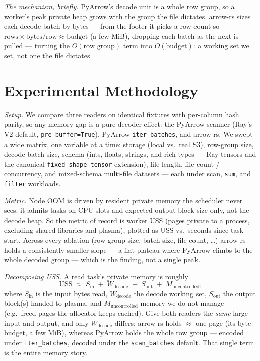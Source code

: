 \documentclass[10pt,twocolumn]{article}
\begin{document}
\emph{The mechanism, briefly.} PyArrow's decode unit is a whole row group, so a worker's
peak private heap grows with the group the file dictates. arrow-rs sizes each decode
batch by bytes --- from the footer it picks a row count so
$\text{rows}\times\text{bytes/row}\approx\text{budget}$ (a few MiB), dropping each batch
as the next is pulled --- turning the $O(\text{row group})$ term into $O(\text{budget})$:
a working set we set, not one the file dictates.

\section{Experimental Methodology}
\emph{Setup.} We compare three readers on identical fixtures with per-column hash parity,
so any memory gap is a pure decoder effect: the PyArrow scanner (Ray's V2 default,
\texttt{pre\_buffer=True}), PyArrow \texttt{iter\_batches}, and arrow-rs. We swept a wide
matrix, one variable at a time: storage (local vs.\ real S3), row-group size, decode batch
size, schema (ints, floats, strings, and rich types --- Ray tensors and the canonical
\texttt{fixed\_shape\_tensor} extension), file length, file count / concurrency, and
mixed-schema multi-file datasets --- each under scan, \texttt{sum}, and \texttt{filter}
workloads.

\emph{Metric.} Node OOM is driven by resident private memory the scheduler never sees: it
admits tasks on CPU slots and expected output-block size only, not the decode heap. So
the metric of record is worker USS (pages private to a process, excluding shared libraries
and plasma), plotted as USS vs.\ seconds since task start. Across every ablation
(row-group size, batch size, file count, \dots) arrow-rs holds a consistently smaller
slope --- a flat plateau where PyArrow climbs to the whole decoded group --- which is the
finding, not a single peak.

\emph{Decomposing USS.} A read task's private memory is roughly
\begin{equation*}
\text{USS} \;\approx\; S_\text{in} \;+\; W_\text{decode} \;+\; S_\text{out} \;+\; M_\text{uncontrolled},
\end{equation*}
where $S_\text{in}$ is the input bytes read, $W_\text{decode}$ the decode working set,
$S_\text{out}$ the output block(s) handed to plasma, and $M_\text{uncontrolled}$ memory we
do not manage (e.g.\ freed pages the allocator keeps cached). Give both readers the
\emph{same} large input and output, and only $W_\text{decode}$ differs: arrow-rs holds
$\approx$ one page (its byte budget, a few MiB), whereas PyArrow holds the whole row group
--- encoded under \texttt{iter\_batches}, decoded under the \texttt{scan\_batches} default.
That single term is the entire memory story.
\end{document}
